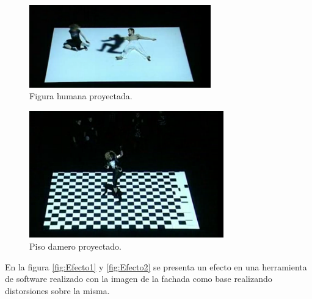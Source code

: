 \begin{minipage}{0.50\textwidth}
\begin{flushleft} \large
\begin{figure}[H]
  \centering
    \includegraphics[width=0.7\textwidth]{./Cap1_intro/instalacionHumano1.png}
  \caption[http://vimeo.com/2774865]{Figura humana proyectada.}
  \label{fig:instalacionHumano1}
\end{figure}
\end{flushleft}
\end{minipage}
\begin{minipage}{0.50\textwidth}
\begin{flushright} \large
\begin{figure}[H]
  \centering
    \includegraphics[width=0.75\textwidth]{./Cap1_intro/instalacionHumano4.png}
  \caption[http://vimeo.com/2774865]{Piso damero proyectado.}
  \label{fig:instalacionHumano2}
\end{figure}
\end{flushright}
\end{minipage}

En la figura \ref{fig:Efecto1} y \ref{fig:Efecto2} se presenta un efecto en una herramienta de software realizado con la imagen de la fachada como base realizando distorsiones sobre la misma.

